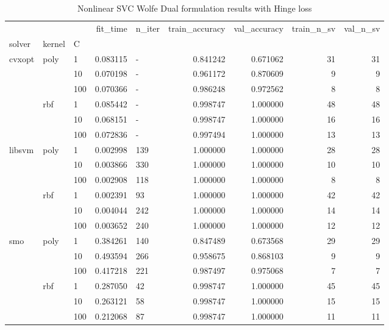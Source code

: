 \begin{table}[h!]
\centering
\caption{Nonlinear SVC Wolfe Dual formulation results with Hinge loss}
\label{nonlinear_dual_svc_cv_results}
\begin{tabular}{lllrlrrrr}
\toprule
    &     &     &  fit\_time & n\_iter &  train\_accuracy &  val\_accuracy &  train\_n\_sv &  val\_n\_sv \\
solver & kernel & C &           &        &                 &               &             &           \\
\midrule
cvxopt & poly & 1   &  0.083115 &      - &        0.841242 &      0.671062 &          31 &        31 \\
    &     & 10  &  0.070198 &      - &        0.961172 &      0.870609 &           9 &         9 \\
    &     & 100 &  0.070366 &      - &        0.986248 &      0.972562 &           8 &         8 \\
    & rbf & 1   &  0.085442 &      - &        0.998747 &      1.000000 &          48 &        48 \\
    &     & 10  &  0.068151 &      - &        0.998747 &      1.000000 &          16 &        16 \\
    &     & 100 &  0.072836 &      - &        0.997494 &      1.000000 &          13 &        13 \\
libsvm & poly & 1   &  0.002998 &    139 &        1.000000 &      1.000000 &          28 &        28 \\
    &     & 10  &  0.003866 &    330 &        1.000000 &      1.000000 &          10 &        10 \\
    &     & 100 &  0.002908 &    118 &        1.000000 &      1.000000 &           8 &         8 \\
    & rbf & 1   &  0.002391 &     93 &        1.000000 &      1.000000 &          42 &        42 \\
    &     & 10  &  0.004044 &    242 &        1.000000 &      1.000000 &          14 &        14 \\
    &     & 100 &  0.003652 &    240 &        1.000000 &      1.000000 &          12 &        12 \\
smo & poly & 1   &  0.384261 &    140 &        0.847489 &      0.673568 &          29 &        29 \\
    &     & 10  &  0.493594 &    266 &        0.958675 &      0.868103 &           9 &         9 \\
    &     & 100 &  0.417218 &    221 &        0.987497 &      0.975068 &           7 &         7 \\
    & rbf & 1   &  0.287050 &     42 &        0.998747 &      1.000000 &          45 &        45 \\
    &     & 10  &  0.263121 &     58 &        0.998747 &      1.000000 &          15 &        15 \\
    &     & 100 &  0.212068 &     87 &        0.998747 &      1.000000 &          11 &        11 \\
\bottomrule
\end{tabular}
\end{table}
